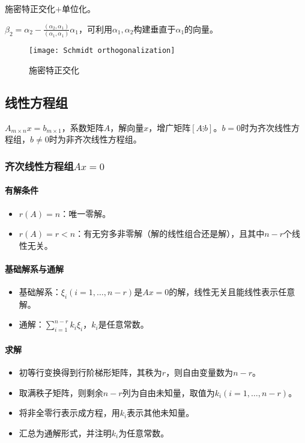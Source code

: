 \documentclass[
12pt, %
a4paper, 
oneside, %
headinclude,footinclude, %
]{scrartcl}
\begin{document}
施密特正交化$ + $单位化。

$ \beta_2 = \alpha_2 - \frac{(\alpha_2, \alpha_1)}{(\alpha_1, \alpha_1)}\alpha_1 $，可利用$ \alpha_1,\alpha_2 $构建垂直于$ \alpha_1 $的向量。

\begin{figure}[H]
\centering 
\texttt{[image: Schmidt orthogonalization]} 
\caption{施密特正交化}
\end{figure}
\subsection[线性方程组]{线性方程组}
$ A_{m \times n}x = b_{m \times 1} $，系数矩阵$ A $，解向量$ x $，增广矩阵$ [A \vdots b] $。$ b = 0 $时为齐次线性方程组，$ b \neq 0 $时为非齐次线性方程组。
\subsubsection[齐次线性方程组]{齐次线性方程组$ Ax = 0 $}
\paragraph{有解条件}
\begin{itemize}
\item $ r(A) = n $：唯一零解。
\item $ r(A) = r < n $：有无穷多非零解（解的线性组合还是解），且其中$ n - r $个线性无关。
\end{itemize}
\paragraph{基础解系与通解}
\begin{itemize}
\item 基础解系：$ \xi_i(i = 1, \dots, n - r) $是$ Ax = 0 $的解，线性无关且能线性表示任意解。
\item 通解：$ \sum_{i = 1}^{n - r} k_i \xi_i $，$ k_i $是任意常数。
\end{itemize}
\paragraph{求解}
\begin{itemize}
\item 初等行变换得到行阶梯形矩阵，其秩为$ r $，则自由变量数为$ n - r $。
\item 取满秩子矩阵，则剩余$ n - r $列为自由未知量，取值为$ k_i(i = 1, \dots, n - r) $。
\item 将非全零行表示成方程，用$ k_i $表示其他未知量。
\item 汇总为通解形式，并注明$ k_i $为任意常数。
\end{itemize}
\end{document}
